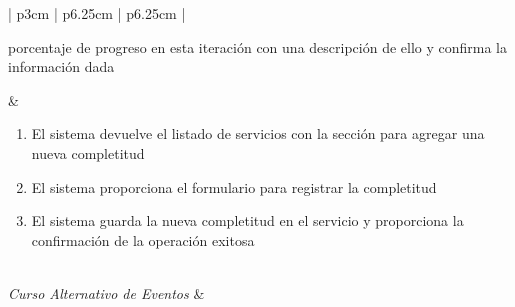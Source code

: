 \begin{center}
{\begin{longtable}{ | p{3cm} | p{6.25cm} | p{6.25cm} | }
\begin{enumerate}[wide, labelwidth=!, labelindent=0cm]
		porcentaje de progreso en esta iteraci\'on
		con una descripci\'on de ello y confirma la
		informaci\'on dada
	\end{enumerate} &%
	\begin{enumerate}[wide, labelwidth=!, labelindent=0cm]
		\vspace{0.25cm}
		\addtocounter{enumi}{1}
		\item El sistema devuelve el listado de
		servicios con la secci\'on para agregar
		una nueva completitud
		\vspace{1cm}
		\addtocounter{enumi}{1}
		\item El sistema proporciona el formulario
		para registrar la completitud
		\vspace{2.25cm}
		\addtocounter{enumi}{1}
		\item El sistema guarda la nueva completitud
		en el servicio y proporciona la confirmaci\'on
		de la operaci\'on exitosa
	\end{enumerate} \\
	\hline
	\raggedleft \textit{Curso Alternativo de Eventos} &
	\multicolumn{2}{ p{13cm} | }{%
		\vspace{-0.25cm}
		\parbox{13cm}{%
		\textit{(ninguno)}
		\vspace{0.25cm}
		}} \\
	\hline
\end{longtable}}
\end{center}